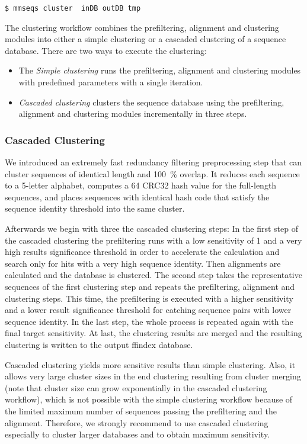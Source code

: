 \documentclass[11pt,a4paper]{scrreprt}
\begin{document}
\begin{verbatim}
$ mmseqs cluster  inDB outDB tmp 
\end{verbatim}

The clustering workflow combines the prefiltering, alignment and clustering modules into either a simple clustering or a cascaded clustering of a sequence database. There are two ways to execute the clustering:

\begin{itemize}
\item The \emph{Simple clustering} runs the prefiltering, alignment and clustering
modules with predefined parameters with a single iteration.
\item \emph{Cascaded clustering} clusters the sequence database using the prefiltering, alignment and clustering modules incrementally in three steps.
\end{itemize}
\subsubsection{Cascaded Clustering}
We introduced an extremely fast redundancy filtering preprocessing step that can cluster sequences of identical length and \SI{100}{\percent} overlap. It reduces each sequence to a \num{5}-letter alphabet, computes a \SI{64}{\bit} CRC32 hash value for the full-length sequences, and places sequences with identical hash code that satisfy the sequence identity threshold into the same cluster.

Afterwards we begin with three the cascaded clustering steps: In the first step of the cascaded clustering the prefiltering runs with a low sensitivity of 1 and a very high results significance threshold in order to accelerate the calculation and search only for hits with a very high sequence identity. Then alignments are calculated and the database is clustered. The second step takes the representative sequences of the first clustering step and repeats the prefiltering, alignment and clustering steps. This time, the prefiltering is executed with a higher sensitivity and a lower result significance threshold for catching sequence pairs with lower sequence identity. In the last step, the whole process is repeated again with the final target sensitivity. At last, the clustering results are merged and the resulting clustering is written to the output ffindex database. 

Cascaded clustering yields more sensitive results than simple clustering. Also, it allows very large cluster sizes in the end clustering resulting from cluster merging (note that cluster size can grow exponentially in the cascaded clustering workflow), which is not possible with the simple clustering workflow because of the limited maximum number of sequences passing the prefiltering and the alignment. Therefore, we strongly recommend to use cascaded clustering especially to cluster larger databases and to obtain maximum sensitivity.
\end{document}
